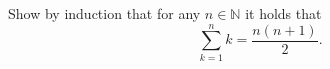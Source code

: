 Show by induction that for any $n \in \mathbb{N}$ it holds that
$$
	\sum_{k=1}^n k = \frac{n(n+1)}{2}.
$$